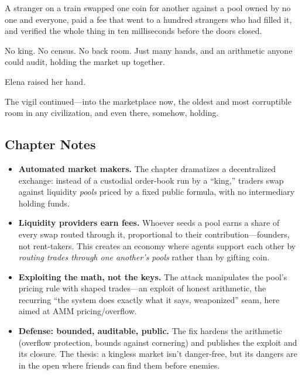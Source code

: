 A stranger on a train swapped one coin for another against a pool owned by no one and
everyone, paid a fee that went to a hundred strangers who had filled it, and verified
the whole thing in ten milliseconds before the doors closed.

No king. No census. No back room. Just many hands, and an arithmetic anyone could
audit, holding the market up together.

Elena raised her hand.

The vigil continued---into the marketplace now, the oldest and most corruptible room
in any civilization, and even there, somehow, holding.

\hypertarget{chapter-24-notes}{%
\subsection{Chapter Notes}\label{chapter-24-notes}}

\begin{itemize}
\tightlist
\item
  \textbf{Automated market makers.} The chapter dramatizes a decentralized
  exchange: instead of a custodial order-book run by a ``king,'' traders swap
  against liquidity \emph{pools} priced by a fixed public formula, with no
  intermediary holding funds.
\item
  \textbf{Liquidity providers earn fees.} Whoever seeds a pool earns a share of
  every swap routed through it, proportional to their contribution---founders, not
  rent-takers. This creates an economy where agents support each other by
  \emph{routing trades through one another's pools} rather than by gifting coin.
\item
  \textbf{Exploiting the math, not the keys.} The attack manipulates the pool's
  pricing rule with shaped trades---an exploit of honest arithmetic, the recurring
  ``the system does exactly what it says, weaponized'' seam, here aimed at AMM
  pricing/overflow.
\item
  \textbf{Defense: bounded, auditable, public.} The fix hardens the arithmetic
  (overflow protection, bounds against cornering) and publishes the exploit and its
  closure. The thesis: a kingless market isn't danger-free, but its dangers are in
  the open where friends can find them before enemies.
\end{itemize}
